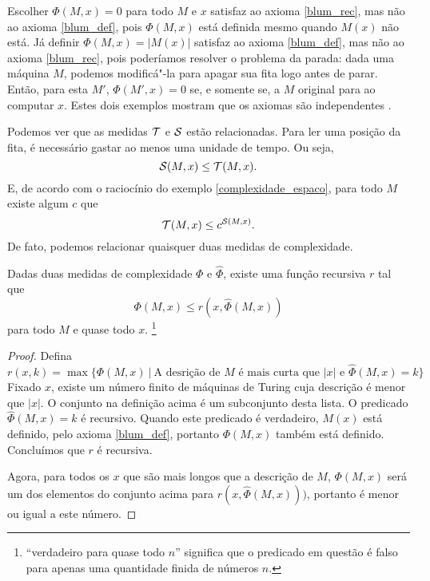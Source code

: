 \begin{example}
    Escolher $\Phi(M, x) = 0$ para todo $M$ e $x$
    satisfaz ao axioma \ref{blum_rec},
    mas não ao axioma \ref{blum_def},
    pois $\Phi(M, x)$ está definida mesmo quando $M(x)$ não está.
    Já definir $\Phi(M, x) = |M(x)|$
    satisfaz ao axioma \ref{blum_def},
    mas não ao axioma \ref{blum_rec},
    pois poderíamos resolver o problema da parada:
    dada uma máquina $M$, podemos modificá"-la
    para apagar sua fita logo antes de parar.
    Então, para esta $M'$,
    $\Phi(M', x) = 0$ se, e somente se,
    a $M$ original para ao computar $x$.
    Estes dois exemplos mostram que os axiomas são independentes
    \cite[p. 3]{Blum1967}.
\end{example}

Podemos ver que as medidas ${\mathcal{T}}$ e ${\mathcal{S}}$ estão relacionadas.
Para ler uma posição da fita,
é necessário gastar ao menos uma unidade de tempo.
Ou seja,
\begin{equation*}
    {\mathcal{S}}(M, x) \leq {\mathcal{T}}(M, x).
\end{equation*}
E, de acordo com o raciocínio do exemplo \ref{complexidade_espaco},
para todo $M$ existe algum $c$ que
\begin{equation*}
    {\mathcal{T}}(M, x) \leq c^{{\mathcal{S}}(M, x)}.
\end{equation*}
De fato, podemos relacionar quaisquer duas medidas de complexidade.

\begin{theorem}
    \label{relacao_medidas}
    Dadas duas medidas de complexidade $\Phi$ e $\hat \Phi$,
    existe uma função recursiva $r$ tal que
    \begin{equation*}
        \Phi(M, x) \leq r( x, \hat \Phi(M, x))
    \end{equation*}
    para todo $M$ e quase todo $x$.
    \footnote{
        ``verdadeiro para quase todo $n$''
        significa que o predicado em questão
        é falso para apenas uma quantidade finida de números $n$.
    }
\end{theorem}

\begin{proof}
    Defina
    \begin{equation*}
        r( x, k ) = \max \{ \Phi(M, x) \ | \
            \text{A desrição de $M$ é mais curta que $|x|$}
            \text{ e }
            \hat \Phi(M, x) = k
        \}
    \end{equation*}
    Fixado $x$, existe um número finito de máquinas de Turing
    cuja descrição é menor que $|x|$.
    O conjunto na definição acima é um subconjunto desta lista.
    O predicado $\hat \Phi(M, x) = k$ é recursivo.
    Quando este predicado é verdadeiro,
    $M(x)$ está definido, pelo axioma \ref{blum_def},
    portanto $\Phi(M, x)$ também está definido.
    Concluímos que $r$ é recursiva.

    Agora, para todos os $x$ que são mais longos que a descrição de $M$,
    $\Phi(M, x)$ será um dos elementos do conjunto acima
    para $r( x, \hat \Phi(M, x)))$,
    portanto é menor ou igual a este número.
\end{proof}

